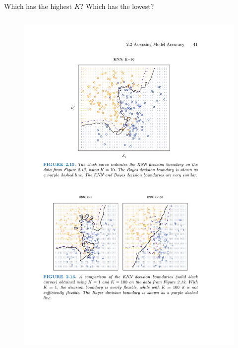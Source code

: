 \documentclass[aspectratio=169]{beamer}
\begin{document}
\begin{frame}{Which has the highest $K$?  Which has the lowest?}
\begin{columns}
\begin{figure}
\includegraphics[width=\textwidth]{KNN_k100}
\caption*{}
\end{figure}


\end{columns}
\end{frame}
\end{document}
